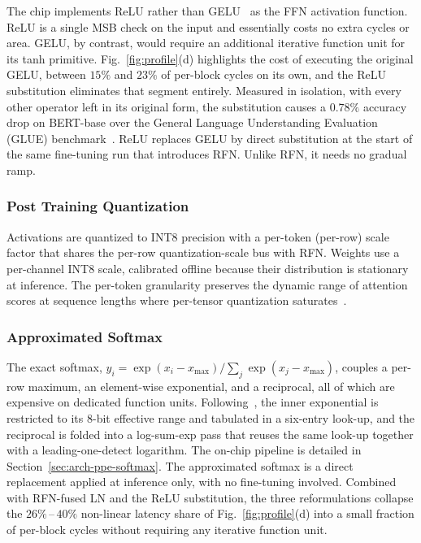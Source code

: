 \documentclass[lettersize,journal]{IEEEtran}
\begin{document}
The chip implements ReLU rather than GELU~\cite{hendrycks2023GELU} as the FFN activation function. ReLU is a single MSB check on the input and essentially costs no extra cycles or area. GELU, by contrast, would require an additional iterative function unit for its tanh primitive. Fig.~\ref{fig:profile}(d) highlights the cost of executing the original GELU, between $15\%$ and $23\%$ of per-block cycles on its own, and the ReLU substitution eliminates that segment entirely. Measured in isolation, with every other operator left in its original form, the substitution causes a $0.78\%$ accuracy drop on BERT-base over the General Language Understanding Evaluation (GLUE) benchmark~\cite{wang2019glue}. ReLU replaces GELU by direct substitution at the start of the same fine-tuning run that introduces RFN. Unlike RFN, it needs no gradual ramp.

\subsubsection{Post Training Quantization}
\label{sec:algo-quant}

Activations are quantized to INT8 precision with a per-token (per-row) scale factor that shares the per-row quantization-scale bus with RFN. Weights use a per-channel INT8 scale, calibrated offline because their distribution is stationary at inference. The per-token granularity preserves the dynamic range of attention scores at sequence lengths where per-tensor quantization saturates~\cite{AWQ,smoothquant}.

\subsubsection{Approximated Softmax}
\label{sec:algo-softmax}

The exact softmax, $y_{i}=\exp(x_{i}-x_{\max})/\sum_{j}\exp(x_{j}-x_{\max})$, couples a per-row maximum, an element-wise exponential, and a reciprocal, all of which are expensive on dedicated function units. Following~\cite{meiqi2018softmax}, the inner exponential is restricted to its 8-bit effective range and tabulated in a six-entry look-up, and the reciprocal is folded into a log-sum-exp pass that reuses the same look-up together with a leading-one-detect logarithm. The on-chip pipeline is detailed in Section~\ref{sec:arch-ppe-softmax}. The approximated softmax is a direct replacement applied at inference only, with no fine-tuning involved. Combined with RFN-fused LN and the ReLU substitution, the three reformulations collapse the $26\%$\,--\,$40\%$ non-linear latency share of Fig.~\ref{fig:profile}(d) into a small fraction of per-block cycles without requiring any iterative function unit.
\end{document}
